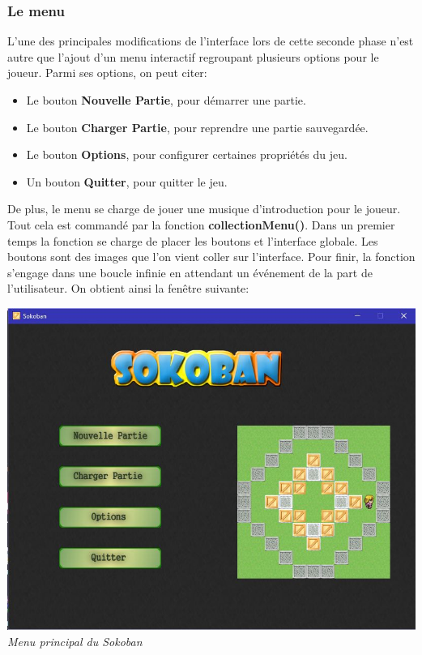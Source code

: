 \documentclass{article}
\begin{document}
			\subsubsection{Le menu}
	L'une des principales modifications de l'interface lors de cette seconde phase n'est autre que l'ajout d'un menu interactif regroupant plusieurs options pour le joueur. Parmi ses options, on peut citer:
\begin{itemize}
\item Le bouton \textbf{Nouvelle Partie}, pour démarrer une partie.
\item Le bouton \textbf{Charger Partie}, pour reprendre une partie sauvegardée.
\item Le bouton \textbf{Options}, pour configurer certaines propriétés du jeu.
\item Un bouton \textbf{Quitter}, pour quitter le jeu.
\end{itemize}
De plus, le menu se charge de jouer une musique d'introduction pour le joueur. Tout cela est commandé par la fonction \textbf{collectionMenu()}. \newline
Dans un premier temps la fonction se charge de placer les boutons et l'interface globale. Les boutons sont des images que l'on vient coller sur l'interface. Pour finir, la fonction s'engage dans une boucle infinie en 
attendant un événement de la part de l'utilisateur. On obtient ainsi la fenêtre suivante: 

\begin{center}
\includegraphics[scale=0.5]{img/menu-interface.jpg} \newline
\textit{Menu principal du Sokoban}
\end{center}
\end{document}
